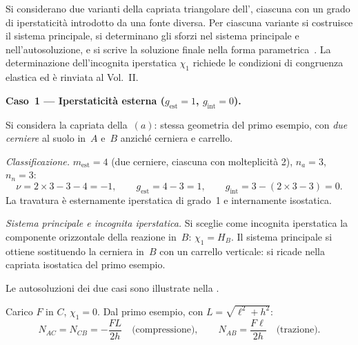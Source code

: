 \begin{esempio}
	Si considerano due varianti della capriata
	triangolare dell',
	ciascuna con un grado di iperstaticità introdotto
	da una fonte diversa. Per ciascuna variante si
	costruisce il sistema principale, si determinano
	gli sforzi nel sistema principale e nell'autosoluzione,
	e si scrive la soluzione finale nella forma
	parametrica~.
	La determinazione dell'incognita iperstatica
	$\chi_1$ richiede le condizioni di congruenza
	elastica ed è rinviata al Vol.~II.
	
	\begin{svolgimento}
		



		
		\noindent\textbf{Caso~1 --- Iperstaticità esterna
			($g_\text{est} = 1$, $g_\text{int} = 0$).}
		
		Si considera la capriata della \,$(a)$:
		stessa geometria del primo esempio, con \emph{due cerniere}
		al suolo in~$A$ e~$B$ anziché cerniera e carrello.
		
		\smallskip
		\noindent\textit{Classificazione.}
		$m_\text{est} = 4$ (due cerniere, ciascuna con
		molteplicità 2), $n_a = 3$, $n_n = 3$:
		\[
		\nu = 2 \times 3 - 3 - 4 = -1,
		\qquad
		g_\text{est} = 4 - 3 = 1,
		\qquad
		g_\text{int} = 3 - (2 \times 3 - 3) = 0.
		\]
		La travatura è esternamente iperstatica di grado~1
		e internamente isostatica.
		
		\smallskip
		\noindent\textit{Sistema principale e incognita
			iperstatica.}
		Si sceglie come incognita iperstatica la componente
		orizzontale della reazione in~$B$: $\chi_1 = H_B$.
		Il sistema principale si ottiene sostituendo la
		cerniera in~$B$ con un carrello verticale: si
		ricade nella capriata isostatica del primo esempio.
		
		Le autosoluzioni dei due casi sono illustrate nella
		.
		
		Carico $F$ in $C$, $\chi_1 = 0$.
		Dal primo esempio, con $L = \sqrt{\ell^2 + h^2}$:
		\[
		N_{AC} = N_{CB} = -\frac{FL}{2h}
		\quad\text{(compressione)},
		\qquad
		N_{AB} = \frac{F\ell}{2h}
		\quad\text{(trazione)}.
		\]
		

\end{svolgimento}
\end{esempio}
